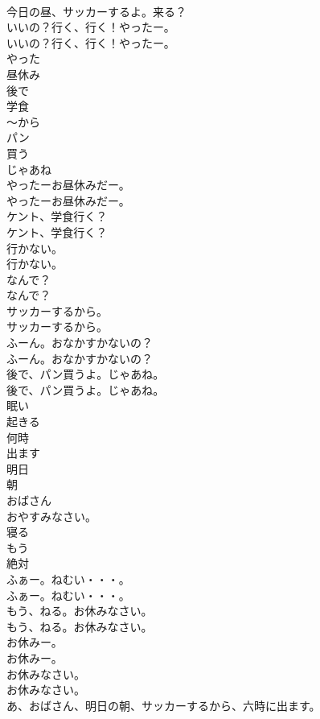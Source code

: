 \documentclass[8pt]{extreport}
\begin{document}
\begin{CJK}{UTF8}{min}
\\	今日の昼、サッカーするよ。来る？ 
\\	いいの？行く、行く！やったー。	
\\	いいの？行く、行く！やったー。 
\\	やった
\\	昼休み
\\	後で
\\	学食
\\	～から
\\	パン
\\	買う
\\	じゃあね
\\	やったーお昼休みだー。	
\\	やったーお昼休みだー。 
\\	ケント、学食行く？	
\\	ケント、学食行く？ 
\\	行かない。	
\\	行かない。 
\\	なんで？	
\\	なんで？ 
\\	サッカーするから。	
\\	サッカーするから。 
\\	ふーん。おなかすかないの？	
\\	ふーん。おなかすかないの？ 
\\	後で、パン買うよ。じゃあね。	
\\	後で、パン買うよ。じゃあね。 
\\	眠い
\\	起きる
\\	何時
\\	出ます
\\	明日
\\	朝
\\	おばさん
\\	おやすみなさい。
\\	寝る
\\	もう
\\	絶対
\\	ふぁー。ねむい・・・。	
\\	ふぁー。ねむい・・・。 
\\	もう、ねる。お休みなさい。	
\\	もう、ねる。お休みなさい。 
\\	お休みー。	
\\	お休みー。 
\\	お休みなさい。	
\\	お休みなさい。 
\\	あ、おばさん、明日の朝、サッカーするから、六時に出ます。	

\end{CJK}
\end{document}
